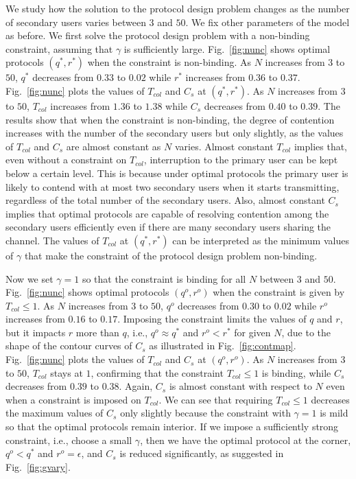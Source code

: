 \documentclass[12pt,draftclsnofoot,onecolumn]{IEEEtran}
\begin{document}
We study how the solution to the protocol design problem changes as the number of
secondary users varies between $3$ and $50$. We fix other parameters of the model as before. We first solve the
protocol design problem with a non-binding constraint, assuming that $\gamma$ is sufficiently large.
Fig.~\ref{fig:nunc} shows optimal
protocols $(q^*,r^*)$ when the constraint is non-binding. As $N$ increases from $3$ to $50$, $q^*$ decreases
from $0.33$ to $0.02$ while $r^*$ increases from $0.36$ to $0.37$.
Fig.~\ref{fig:nunc} plots the values of $T_{col}$ and $C_s$
at $(q^*,r^*)$. As $N$ increases from $3$ to $50$,
$T_{col}$ increases from $1.36$ to $1.38$ while
$C_s$ decreases from $0.40$ to $0.39$.
The results show that when the constraint is non-binding,
the degree of contention increases with the number of the secondary users
but only slightly, as the values of $T_{col}$ and $C_s$ are almost constant as $N$ varies.
Almost constant $T_{col}$ implies that, even without a constraint on $T_{col}$, interruption to the primary user
can be kept below a certain level.
This is because under optimal protocols the primary user is likely to contend with
at most two secondary users when it starts transmitting, regardless of the total number
of the secondary users.
Also, almost constant $C_s$ implies that optimal protocols are capable of resolving contention among
the secondary users efficiently even if there are many secondary users sharing the channel.
The values of $T_{col}$ at $(q^*,r^*)$
can be interpreted as the minimum values of $\gamma$ that make the constraint of
the protocol design problem non-binding.

Now we set $\gamma = 1$ so that the constraint is binding for all $N$ between $3$ and $50$.
Fig.~\ref{fig:nunc} shows optimal
protocols $(q^o,r^o)$ when the constraint is given by $T_{col} \leq 1$. As $N$ increases from $3$ to $50$, $q^o$ decreases
from $0.30$ to $0.02$ while $r^o$ increases from $0.16$ to $0.17$.
Imposing the constraint limits the values of $q$ and $r$,
but it impacts $r$ more than $q$, i.e., $q^o \approx q^*$ and $r^o < r^*$ for given $N$,
due to the shape of the contour curves of $C_s$ as illustrated in Fig.~\ref{fig:contmap}.
Fig.~\ref{fig:nunc} plots the values of $T_{col}$ and $C_s$
at $(q^o,r^o)$. As $N$ increases from $3$ to $50$,
$T_{col}$ stays at $1$, confirming that the constraint $T_{col} \leq 1$ is binding,
while $C_s$ decreases from $0.39$ to $0.38$.
Again, $C_s$ is almost constant with respect to $N$ even when a constraint is imposed on $T_{col}$.
We can see that requiring $T_{col} \leq 1$ decreases the maximum values of $C_s$
only slightly because the constraint with $\gamma = 1$ is mild so that
the optimal protocols remain interior. If we impose a sufficiently strong constraint,
i.e., choose a small $\gamma$, then we have the optimal protocol at the corner, $q^o < q^*$ and $r^o = \epsilon$,
and $C_s$ is reduced significantly, as suggested in Fig.~\ref{fig:gvary}.
\end{document}
